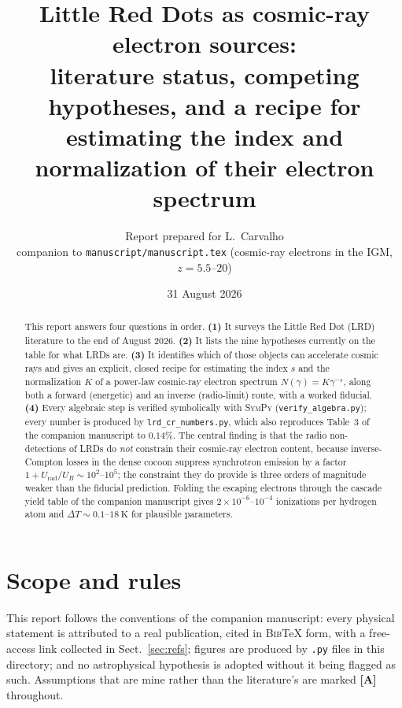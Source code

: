\documentclass[11pt,a4paper]{article}
\title{\bf Little Red Dots as cosmic-ray electron sources:\\
       literature status, competing hypotheses, and a recipe for\\
       estimating the index and normalization of their electron spectrum}
\author{Report prepared for L.\ Carvalho \\
        \small companion to \texttt{manuscript/manuscript.tex}
        (cosmic-ray electrons in the IGM, $z=5.5$--$20$)}
\date{31 August 2026}
\begin{document}
\maketitle

\begin{abstract}
\noindent
This report answers four questions in order. \textbf{(1)} It surveys the Little
Red Dot (LRD) literature to the end of August 2026. \textbf{(2)} It lists the
nine hypotheses currently on the table for what LRDs are. \textbf{(3)} It
identifies which of those objects can accelerate cosmic rays and gives an
explicit, closed recipe for estimating the index $s$ and the normalization $K$
of a power-law cosmic-ray electron spectrum $N(\gamma)=K\gamma^{-s}$, along both
a forward (energetic) and an inverse (radio-limit) route, with a worked fiducial.
\textbf{(4)} Every algebraic step is verified symbolically with
\textsc{SymPy} (\texttt{verify\_algebra.py}); every number is produced by
\texttt{lrd\_cr\_numbers.py}, which also reproduces Table~3 of the companion
manuscript to $0.14\%$. The central finding is that the radio non-detections of
LRDs do \emph{not} constrain their cosmic-ray electron content, because
inverse-Compton losses in the dense cocoon suppress synchrotron emission by a
factor $1+U_{\mathrm{rad}}/U_B \sim 10^2$--$10^5$; the constraint they do
provide is three orders of magnitude weaker than the fiducial prediction.
Folding the escaping electrons through the cascade yield table of the companion
manuscript gives $2\times10^{-6}$--$10^{-4}$ ionizations per hydrogen atom and
$\Delta T\sim0.1$--$18\ \mathrm{K}$ for plausible parameters.
\end{abstract}

\section{Scope and rules}
This report follows the conventions of the companion manuscript: every physical
statement is attributed to a real publication, cited in \textsc{Bib}\TeX{} form,
with a free-access link collected in Sect.~\ref{sec:refs}; figures are produced
by \texttt{.py} files in this directory; and no astrophysical hypothesis is
adopted without it being flagged as such. Assumptions that are mine rather than
the literature's are marked \textbf{[A]} throughout.

\end{document}
